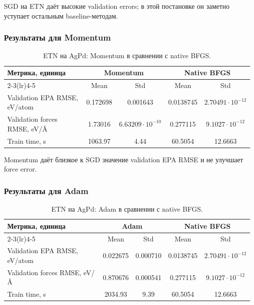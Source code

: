
SGD на ETN даёт высокие validation errors; в этой постановке он заметно уступает остальным baseline-методам.

\FloatBarrier

\subsubsection{Результаты для Momentum}

\begin{table}[H]
\centering
\small
\caption{ETN на AgPd: Momentum в сравнении с native BFGS.}
\label{tab:etn-agpd-momentum}
\begin{tabular}{lcccc}
\toprule
\multirow{2}{*}{Метрика, единица} & \multicolumn{2}{c}{Momentum} & \multicolumn{2}{c}{Native BFGS} \\
\cmidrule(lr){2-3}\cmidrule(lr){4-5}
 & Mean & Std & Mean & Std \\
\midrule
Validation EPA RMSE, eV/atom & 0.172698 & 0.001643 & 0.0138745 & \(2.70491\cdot 10^{-12}\) \\
Validation forces RMSE, eV/\AA & 1.73016 & \(6.63209\cdot 10^{-10}\) & 0.277115 & \(9.1027\cdot 10^{-12}\) \\
Train time, s & 1063.97 & 4.44 & 60.5054 & 12.6663 \\
\bottomrule
\end{tabular}
\end{table}


Momentum даёт близкое к SGD значение validation EPA RMSE и не улучшает force error.

\FloatBarrier

\subsubsection{Результаты для Adam}

\begin{table}[H]
\centering
\small
\caption{ETN на AgPd: Adam в сравнении с native BFGS.}
\label{tab:etn-agpd-adam}
\begin{tabular}{lcccc}
\toprule
\multirow{2}{*}{Метрика, единица} & \multicolumn{2}{c}{Adam} & \multicolumn{2}{c}{Native BFGS} \\
\cmidrule(lr){2-3}\cmidrule(lr){4-5}
 & Mean & Std & Mean & Std \\
\midrule
Validation EPA RMSE, eV/atom & 0.022675 & 0.000710 & 0.0138745 & \(2.70491\cdot 10^{-12}\) \\
Validation forces RMSE, eV/\AA & 0.870676 & 0.000541 & 0.277115 & \(9.1027\cdot 10^{-12}\) \\
Train time, s & 2034.93 & 9.39 & 60.5054 & 12.6663 \\
\bottomrule
\end{tabular}
\end{table}

